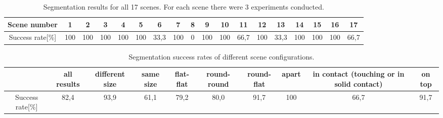 \begin{table}[h!]\scriptsize
\hspace*{-2.5cm} 
\begin{tabular}{|c|c| c| c| c| c| c|c|c|c|c|c|c|c|c|c|c|c|}
\hline    Scene   number    &1   &    2    &   3    &4   &5&6&7&    8&
9&10&11&12&13&14&15&16&17\\ \hline  Success rate[\%] & 100  & 100 &100
&100&100&33,3  & 100  &  0  & 100&  100&  66,7& 100&33,3  &100&100&100
&66,7\\\hline
\end{tabular}
\caption{Segmentation results for  all 17 scenes.  For each scene there  were 3 experiments conducted.}
      \label{tab:chart_result}
\end{table}

\begin{table}[h!]\scriptsize
\hspace*{-4cm} 
\begin{tabular}{|c |c| c| c| c| c| c|c|c|c|}
\hline    &all    results   &    different    size    &   same    size
&flat-flat&round-round&round-flat & apart & in contact (touching or in
solid contact) & on top\\ \hline Success rate[\%] & 82,4 & 93,9 & 61,1
&79,2&80,0&91,7 & 100 & 66,7 & 91,7\\\hline
\end{tabular}
\caption{Segmentation success rates of different scene configurations.
}
\label{tab:result_percentage}
\end{table}

